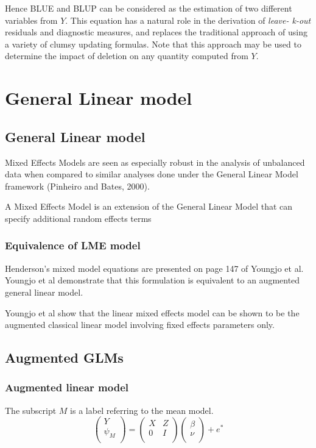 \documentclass[12pt, a4paper]{article}
\begin{document}
Hence BLUE and BLUP can be considered as the estimation of two different variables from $Y$. This equation has a natural role in the derivation of \emph{leave- k-out} residuals and diagnostic measures, and replaces the traditional approach of using a variety of clumsy updating formulas. Note that this approach may be used to determine the impact of deletion on any quantity computed from $Y$.

\chapter{General Linear model}
\section{General Linear model} Mixed Effects Models are seen as
especially robust in the analysis of unbalanced data when compared
to similar analyses done under the General Linear Model framework
(Pinheiro and Bates, 2000).

A Mixed Effects Model is an extension of the General Linear Model
that can specify additional random effects terms

\subsection{Equivalence of LME model}
Henderson's mixed model equations are presented on page 147 of
Youngjo et al. Youngjo et al demonstrate that this formulation is
equivalent to an augmented general linear model.

Youngjo et al show that the linear mixed effects model can be
shown to be the augmented classical linear model involving fixed
effects parameters only.

\section{Augmented GLMs}
\subsection{Augmented linear model}
The subscript $M$ is a label referring to the mean model.
\begin{equation}
\left(%
\begin{array}{c}
Y \\
\psi_{M} \\
\end{array}%
\right) = \left(
\begin{array}{cc}
X & Z \\
0 & I \\
\end{array}\right) \left(%
\begin{array}{c}
\beta \\
\nu \\
\end{array}%
\right)+ e^{*}
\end{equation}
\end{document}
